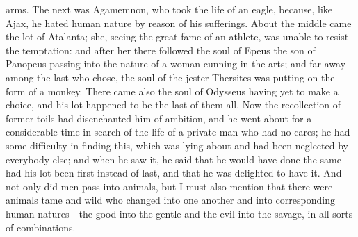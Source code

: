 \documentclass[12pt]{article}
\begin{document}
arms. The next was Agamemnon, who took the life of an eagle, because, like
Ajax, he hated human nature by reason of his sufferings. About the middle came
the lot of Atalanta; she, seeing the great fame of an athlete, was unable to
resist the temptation: and after her there followed the soul of Epeus the son
of Panopeus passing into the nature of a woman cunning in the arts; and far
away among the last who chose, the soul of the jester Thersites was putting on
the form of a monkey. There came also the soul of Odysseus having yet to make a
choice, and his lot happened to be the last of them all. Now the recollection
of former toils had disenchanted him of ambition, and he went about for a
considerable time in search of the life of a private man who had no cares; he
had some difficulty in finding this, which was lying about and had been
neglected by everybody else; and when he saw it, he said that he would have
done the same had his lot been first instead of last, and that he was delighted
to have it. And not only did men pass into animals, but I must also mention
that there were animals tame and wild who changed into one another and into
corresponding human natures---the good into the gentle and the evil into the
savage, in all sorts of combinations.
\end{document}
